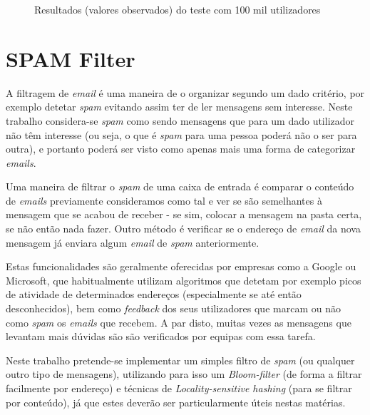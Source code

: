 \documentclass[a4paper,11pt,openright,oneside]{report}
\begin{document}
\begin{figure}[ht]
\center
{}
\caption{Resultados (valores observados) do teste com 100 mil utilizadores}
\label{fig:test100ko}
\end{figure}


\chapter{SPAM Filter}
\label{chap.spamfilter}

A filtragem de \textit{email} é uma maneira de o organizar segundo um dado critério, por exemplo detetar \textit{spam} evitando assim ter de ler mensagens sem interesse. Neste trabalho considera-se \textit{spam} como sendo mensagens que para um dado utilizador não têm interesse (ou seja, o que é \textit{spam} para uma pessoa poderá não o ser para outra), e portanto poderá ser visto como apenas mais uma forma de categorizar \textit{emails}.

Uma maneira de filtrar o \textit{spam} de uma caixa de entrada é comparar o conteúdo de \textit{emails} previamente consideramos como tal e ver se são semelhantes à mensagem que se acabou de receber - se sim, colocar a mensagem na pasta certa, se não então nada fazer. Outro método é verificar se o endereço de \textit{email} da nova mensagem já enviara algum \textit{email} de \textit{spam} anteriormente.

Estas funcionalidades são geralmente oferecidas por empresas como a Google ou Microsoft, que habitualmente utilizam algoritmos que detetam por exemplo picos de atividade de determinados endereços (especialmente se até então desconhecidos), bem como \textit{feedback} dos seus utilizadores que marcam ou não como \textit{spam} os \textit{emails} que recebem. A par disto, muitas vezes as mensagens que levantam mais dúvidas são são verificados por equipas com essa tarefa.

Neste trabalho pretende-se implementar um simples filtro de \textit{spam} (ou qualquer outro tipo de mensagens), utilizando para isso um \textit{Bloom-filter} (de forma a filtrar facilmente por endereço) e técnicas de \textit{Locality-sensitive hashing} (para se filtrar por conteúdo), já que estes deverão ser particularmente úteis nestas matérias.
\end{document}
